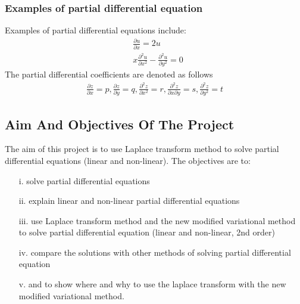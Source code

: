 \documentclass[12pt]{report}
\begin{document}
\subsection {Examples of partial differential equation}
Examples of partial differential equations include:
\begin{align*}
& \frac{\partial u}{\partial x}=2u \\
& x \frac{\partial^2u}{\partial x^2}-\frac{\partial^2u}{\partial y^2}=0
\end{align*}
The partial differential coefficients are denoted as follows
\begin{align*}
 \frac{\partial z}{\partial x}=p, \frac{\partial z}{\partial y}=q, \frac{\partial^2z}{\partial x^2}=r,
\frac{\partial^2z}{\partial x \partial y}=s, \frac{\partial^2z}{\partial y^2}=t
\end{align*}
\section{Aim And Objectives Of The Project}
\qquad The aim of this project is to use Laplace transform method to solve partial differential equations (linear and non-linear). The objectives are to:
\begin{enumerate}
	\item[i.] solve partial differential equations
  \item[ii.] explain linear and non-linear partial differential equations
  \item[iii.] use Laplace transform method and the new modified variational method to solve partial differential equation (linear and non-linear, 2nd order)
	\item[iv.] compare the solutions with other methods of solving partial differential equation
	\item[v.] and to show where and why to use the laplace transform with the new modified variational method.
\end{enumerate}
\chapter{}
\end{document}
